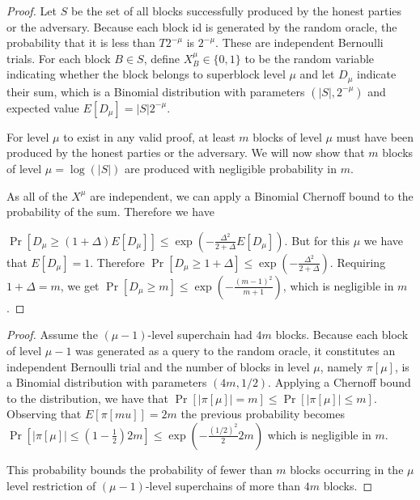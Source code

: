 \begin{proof}
    Let $S$ be the set of all blocks successfully produced by the honest
    parties or the adversary. Because each block id is generated by the random
    oracle, the probability that it is less than $T 2^{-\mu}$ is
    $2^{-\mu}$. These are independent Bernoulli trials. For each block
    $B \in S$, define $X^{\mu}_B \in \{0, 1\}$ to be the random variable
    indicating whether the block belongs to superblock level $\mu$ and let
    $D_\mu$ indicate their sum, which is a Binomial distribution with
    parameters $(|S|, 2^{-\mu})$ and expected value $E[D_{\mu}] =
    |S| 2^{-\mu}$.

    For level $\mu$ to exist in any valid proof, at least $m$ blocks of level
    $\mu$ must have been produced by the honest parties or the adversary. We
    will now show that $m$ blocks of level $\mu = \log(|S|)$ are produced with
    negligible probability in $m$.

    As all of the $X^{\mu}$ are independent, we can apply a Binomial Chernoff
    bound to the probability of the sum. Therefore we have

    $\Pr[D_\mu \geq (1 + \Delta)E[D_\mu]] \leq \exp(-\frac{\Delta^2}{2 +
    \Delta}E[D_\mu])$. But for this $\mu$ we have that $E[D_\mu] = 1$.
    Therefore $\Pr[D_\mu \geq 1 + \Delta] \leq \exp(-\frac{\Delta^2}{2 +
    \Delta})$. Requiring $1 + \Delta = m$, we get $\Pr[D_\mu \geq m] \leq
    \exp(-\frac{(m - 1)^2}{m + 1})$, which is negligible in $m$.
\end{proof}

\restateThmLargeExpansion*

\begin{proof}
    Assume the $(\mu - 1)$-level superchain had $4m$ blocks. Because each block
    of level $\mu - 1$ was generated as a query to the random oracle, it
    constitutes an independent Bernoulli trial and the number of blocks in
    level $\mu$, namely $\pi[\mu]$, is a Binomial distribution with parameters
    $(4m, 1/2)$. Applying a Chernoff bound to the
    distribution, we have that $\Pr[|\pi[\mu]| = m] \leq \Pr[|\pi[\mu]| \leq
    m]$. Observing that $E[\pi[mu]] = 2m$ the previous probability becomes
    $\Pr[|\pi[\mu]| \leq (1 - \frac{1}{2})2m] \leq \exp(-\frac{(1/2)^2}{2} 2m)$
    which is negligible in $m$.

    This probability bounds the probability of fewer
    than $m$ blocks occurring in the $\mu$ level restriction of $(\mu -
    1)$-level superchains of more than $4m$ blocks.
\end{proof}

